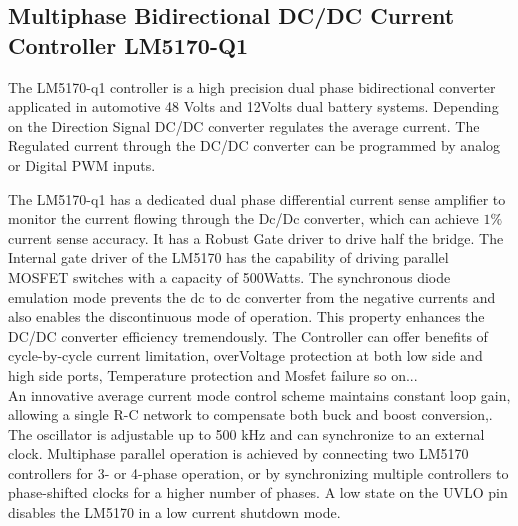\subsection{Multiphase Bidirectional DC/DC Current Controller LM5170-Q1}
\indent The LM5170-q1\cite{TI_LM5170_User_Datasheet} controller is a high precision dual phase bidirectional converter applicated in automotive 48 Volts and 12Volts dual battery systems.
Depending on the Direction Signal DC/DC converter regulates the average current. 
The Regulated current through the DC/DC converter can be programmed by analog or Digital PWM inputs.

The LM5170-q1\cite{TI_LM5170_User_Datasheet} has a dedicated dual phase differential current sense amplifier to monitor the current flowing through the Dc/Dc converter, which can achieve $1\%$ current sense accuracy.
It has a Robust Gate driver to drive half the bridge. The Internal gate driver of the LM5170 has the capability of driving parallel MOSFET switches with a capacity of 500Watts. 
The synchronous diode emulation mode prevents the dc to dc converter from the negative currents and also enables the discontinuous mode of operation. This property enhances the DC/DC converter efficiency tremendously. The Controller can offer benefits of cycle-by-cycle current limitation, overVoltage protection at both low side and high side ports, Temperature protection and Mosfet failure so on...
\\
\indent An innovative average current mode control scheme maintains constant loop gain, allowing a single R-C network
to compensate both buck and boost conversion\cite[p .2]{TI_LM5170_User_Datasheet},\cite{TI_LM5170_EVM_User_Guide}. The oscillator is adjustable up to 500 kHz and can synchronize
to an external clock. Multiphase parallel operation is achieved by connecting two LM5170 controllers for 3-
or 4-phase operation, or by synchronizing multiple controllers to phase-shifted clocks for a higher number of
phases. A low state on the UVLO pin disables the LM5170 in a low current shutdown mode\cite{TI_LM5170_User_Datasheet}.

